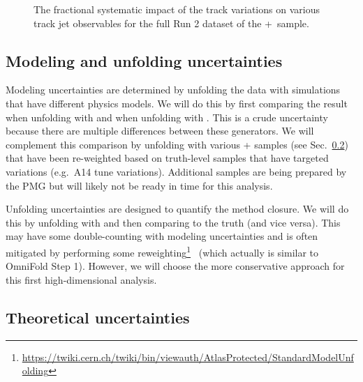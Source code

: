 {\begin{figure}[h!]
  \caption{The fractional systematic impact of the track variations on various track jet observables for the full Run 2 dataset of the \powheg+\pythia~sample.}
  \label{fig:PP8TrackJetSyst}
\end{figure}

\subsection{Modeling and unfolding uncertainties}

Modeling uncertainties are determined by unfolding the data with simulations that have different physics models.  We will do this by first comparing the result when unfolding with \pythia{} and when unfolding with \sherpa.  This is a crude uncertainty because there are multiple differences between these generators.  We will complement this comparison by unfolding with various \powheg+\pythia{} samples (see Sec.~\ref{sec:theoryuncerts}) that have been re-weighted based on truth-level samples that have targeted variations (e.g.\ A14 tune variations).  Additional samples are being prepared by the PMG but will likely not be ready in time for this analysis.

Unfolding uncertainties are designed to quantify the method closure.  We will do this by unfolding \pythia{} with \sherpa{} and then comparing to the \pythia{} truth (and vice versa).  This may have some double-counting with modeling uncertainties and is often mitigated by performing some reweighting\footnote{\url{https://twiki.cern.ch/twiki/bin/viewauth/AtlasProtected/StandardModelUnfolding}}~\cite{Malaescu:2009dm} (which actually is similar to OmniFold Step 1).  However, we will choose the more conservative approach for this first high-dimensional analysis.

\clearpage

\subsection{Theoretical uncertainties}
\label{sec:theoryuncerts}
}
